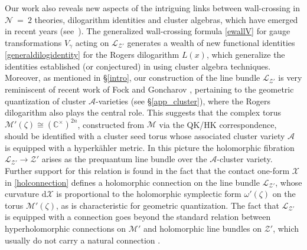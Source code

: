 \documentclass[12pt,reqno]{article}
\numberwithin{equation}{section}
\newcommand{\de}{\mathrm{d}}
\newcommand{\cA}{\mathcal{A}}
\newcommand{\cM}{\mathcal{M}}
\newcommand{\cN}{\mathcal{N}}
\newcommand{\cX}{\mathcal{X}}
\newcommand{\cZ}{\mathcal{Z}}
\newcommand{\lb}{\mathscr{L}}
\def\varpihk{\zeta}
\def\pcM{\cM'}
\def\pcZ{\cZ'}
\def\pomega{\omega'}
\numberwithin{equation}{section}
\begin{document}
Our work also reveals new aspects of the intriguing links between wall-crossing in $\cN~=~2$ theories,
dilogarithm identities and cluster algebras, which have emerged in recent years
(see~\cite{ks,Gaiotto:2010be,Cecotti:2010fi,Keller:2011}). The
generalized wall-crossing formula \eqref{ewallV} for gauge transformations $V_\gamma$
acting on $\lb_{\pcZ}$ generates a wealth of new functional identities \eqref{generaldilogidentity}
for the Rogers dilogarithm $L(x)$, which generalize the identities established (or conjectured)
in \cite{Nakanishi:2010,Keller:2010,Keller:2010b} using cluster algebra techniques.
Moreover, as mentioned in \S\ref{intro},
our construction of the line bundle $\lb_{\pcZ}$ is very reminiscent of recent work of Fock
and Goncharov \cite{FGgeometricquantization}, pertaining to the geometric quantization of
cluster $\cA$-varieties (see \S\ref{app_cluster}), where the Rogers dilogarithm also plays
the central role. This suggests that the complex torus $\pcM(\varpihk)\cong (\mathbb{C}^{\times})^{2n}$,
constructed from $\cM$ via the QK/HK correspondence, should be identified with a cluster seed torus
whose associated cluster variety $\cA$ is equipped with a hyperk\"ahler metric. In this picture
the holomorphic fibration $\lb_{\pcZ}\to \pcZ$ arises as the prequantum line bundle over the $\cA$-cluster variety.
Further support for this relation is found in the fact that the contact one-form $\cX$ in
\eqref{holconnection} defines a holomorphic connection on the line bundle $\lb_{\pcZ}$,
whose curvature $\de \cX$ is proportional to the holomorphic symplectic
form $\pomega(\varpihk)$
on the torus $\pcM(\varpihk)$, as is characteristic for geometric quantization.
The fact that $\lb_{\pcZ}$ is equipped with a connection goes beyond the standard relation
between hyperholomorphic connections on $\pcM$ and holomorphic line bundles
on $\pcZ$, which usually do not carry a natural connection \cite{ward-wells}.
\end{document}
